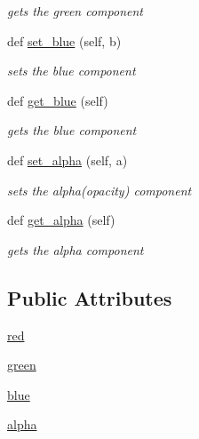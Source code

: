 \begin{DoxyCompactItemize}
\begin{DoxyCompactList}\small\item\em gets the green component \end{DoxyCompactList}\item 
def \hyperlink{class_color_1_1_color_a50020c439e6ab125740693fac26a9d03}{set\+\_\+blue} (self, b)
\begin{DoxyCompactList}\small\item\em sets the blue component \end{DoxyCompactList}\item 
def \hyperlink{class_color_1_1_color_aaa7374344b8ce6259640de843313a451}{get\+\_\+blue} (self)
\begin{DoxyCompactList}\small\item\em gets the blue component \end{DoxyCompactList}\item 
def \hyperlink{class_color_1_1_color_a836636fad102a8450116e5490820997d}{set\+\_\+alpha} (self, a)
\begin{DoxyCompactList}\small\item\em sets the alpha(opacity) component \end{DoxyCompactList}\item 
def \hyperlink{class_color_1_1_color_a30a4e9e774e762f07cc93e02c3e21c42}{get\+\_\+alpha} (self)
\begin{DoxyCompactList}\small\item\em gets the alpha component \end{DoxyCompactList}\end{DoxyCompactItemize}
\subsection*{Public Attributes}
\begin{DoxyCompactItemize}
\item 
\hyperlink{class_color_1_1_color_ad6b9578f975c4f066a1e34dff6ac557a}{red}
\item 
\hyperlink{class_color_1_1_color_a608f39a75b991c1ffda8bd91d9744d2b}{green}
\item 
\hyperlink{class_color_1_1_color_aae0c5d7ff0540d207fac048534b7e8bf}{blue}
\item 
\hyperlink{class_color_1_1_color_a27e8f74882075cc184a9bbc2da65f8a3}{alpha}
\end{DoxyCompactItemize}
